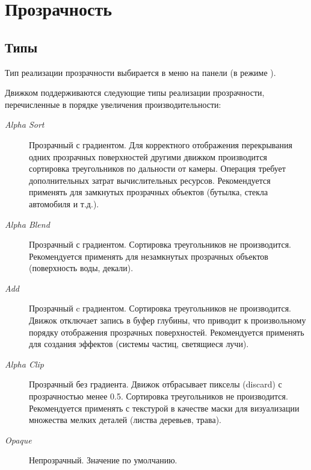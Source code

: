 \documentclass[a4paper,12pt,oneside]{sphinxmanual}
\begin{document}

\section{Прозрачность}
\label{materials:id3}\label{materials:index-2}

\subsection{Типы}
\label{materials:id4}\label{materials:index-3}
Тип реализации прозрачности выбирается в меню  на панели  (в режиме ).

Движком поддерживаются следующие типы реализации прозрачности, перечисленные в порядке увеличения производительности:
\begin{description}
\item[{\emph{Alpha Sort}}] \leavevmode
Прозрачный с градиентом. Для корректного отображения перекрывания одних прозрачных поверхностей другими движком производится сортировка треугольников по дальности от камеры. Операция требует дополнительных затрат вычислительных ресурсов. Рекомендуется применять для замкнутых прозрачных объектов (бутылка, стекла автомобиля и т.д.).

\item[{\emph{Alpha Blend}}] \leavevmode
Прозрачный с градиентом. Сортировка треугольников не производится. Рекомендуется применять для незамкнутых прозрачных объектов (поверхность воды, декали).

\item[{\emph{Add}}] \leavevmode
Прозрачный c градиентом. Сортировка треугольников не производится. Движок отключает запись в буфер глубины, что приводит к произвольному порядку отображения прозрачных поверхностей. Рекомендуется применять для создания эффектов (системы частиц, светящиеся лучи).

\item[{\emph{Alpha Clip}}] \leavevmode
Прозрачный без градиента. Движок отбрасывает пикселы (discard) с прозрачностью менее 0.5. Сортировка треугольников не производится. Рекомендуется применять с текстурой в качестве маски для визуализации множества мелких деталей (листва деревьев, трава).

\item[{\emph{Opaque}}] \leavevmode
Непрозрачный. Значение по умолчанию.

\end{description}
\end{document}
